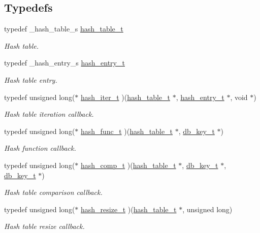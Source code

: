 \subsection*{Typedefs}
\begin{CompactItemize}
\item 
typedef \_\-hash\_\-table\_\-s \hyperlink{group__dbprim__hash_a0}{hash\_\-table\_\-t}
\begin{CompactList}\small\item\em Hash table. \item\end{CompactList}\item 
typedef \_\-hash\_\-entry\_\-s \hyperlink{group__dbprim__hash_a1}{hash\_\-entry\_\-t}
\begin{CompactList}\small\item\em Hash table entry. \item\end{CompactList}\item 
typedef unsigned long($\ast$ \hyperlink{group__dbprim__hash_a2}{hash\_\-iter\_\-t} )(\hyperlink{dbprim_8h_a0}{hash\_\-table\_\-t} $\ast$, \hyperlink{dbprim_8h_a1}{hash\_\-entry\_\-t} $\ast$, void $\ast$)
\begin{CompactList}\small\item\em Hash table iteration callback. \item\end{CompactList}\item 
typedef unsigned long($\ast$ \hyperlink{group__dbprim__hash_a3}{hash\_\-func\_\-t} )(\hyperlink{dbprim_8h_a0}{hash\_\-table\_\-t} $\ast$, \hyperlink{dbprim_8h_a0}{db\_\-key\_\-t} $\ast$)
\begin{CompactList}\small\item\em Hash function callback. \item\end{CompactList}\item 
typedef unsigned long($\ast$ \hyperlink{group__dbprim__hash_a4}{hash\_\-comp\_\-t} )(\hyperlink{dbprim_8h_a0}{hash\_\-table\_\-t} $\ast$, \hyperlink{dbprim_8h_a0}{db\_\-key\_\-t} $\ast$, \hyperlink{dbprim_8h_a0}{db\_\-key\_\-t} $\ast$)
\begin{CompactList}\small\item\em Hash table comparison callback. \item\end{CompactList}\item 
typedef unsigned long($\ast$ \hyperlink{group__dbprim__hash_a5}{hash\_\-resize\_\-t} )(\hyperlink{dbprim_8h_a0}{hash\_\-table\_\-t} $\ast$, unsigned long)
\begin{CompactList}\small\item\em Hash table resize callback. \item\end{CompactList}\end{CompactItemize}
